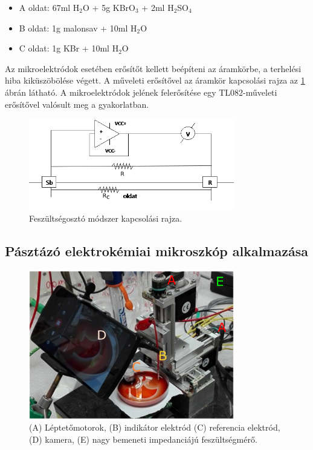 \begin{itemize} \label{komponensek}
\item A oldat: 67ml H$_2$O + 5g KBrO$_3$ + 2ml H$_2$SO$_4$
\item B oldat: 1g malonsav + 10ml H$_2$O
\item C oldat: 1g KBr + 10ml H$_2$O
\end{itemize}

Az mikroelektródok esetében erősítőt kellett beépíteni az áramkörbe, a terhelési hiba kiküszöbölése végett. A műveleti erősítővel az áramkör kapcsolási rajza az \ref{fig:erosito} ábrán látható. A mikroelektródok jelének felerősítése egy TL082-műveleti erősítővel valósult meg a gyakorlatban.
\begin{figure}[h!]
\centering
\includegraphics[width=0.8\textwidth]{img/erosito2.png}
\caption{Feszültségosztó módszer kapcsolási rajza.}
\label{fig:erosito}
\end{figure}

\subsection{Pásztázó elektrokémiai mikroszkóp alkalmazása}

\begin{figure}[h]
\centering
\includegraphics[width=0.8\textwidth]{img/secm.png}
\caption{(A) Léptetőmotorok, (B) indikátor elektród (C) referencia elektród, (D) kamera, (E) nagy bemeneti impedanciájú feszültségmérő.}
\label{fig:secm}
\end{figure}

